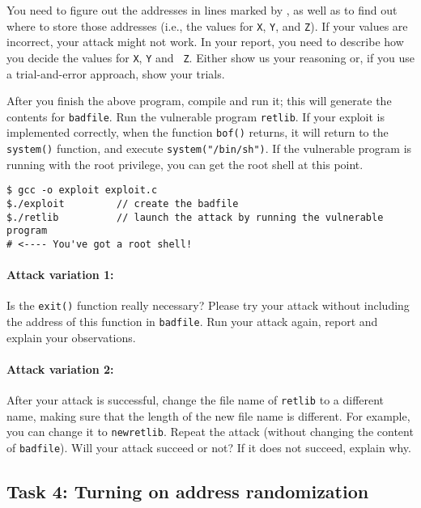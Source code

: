 You need to figure out the addresses in lines marked by , as well as to
find out where to store those addresses (i.e., the values 
for \texttt{X}, \texttt{Y}, and \texttt{Z}). If your values are incorrect, 
your attack might not work. In your report, you need to 
describe how you decide the values for {\tt X}, {\tt Y} and {\tt
Z}. Either show us your reasoning or, if you use a trial-and-error approach,
show your trials.


After you finish the above program, compile and run it; this will
generate the contents for \texttt{badfile}. Run the vulnerable program 
\texttt{retlib}. If your exploit is implemented correctly, when the function
\texttt{bof()} returns, it will return to the \texttt{system()} function,
and execute \texttt{system("/bin/sh")}. If the vulnerable program is
running with the root privilege, you can get the root shell at this
point.

\begin{lstlisting}
$ gcc -o exploit exploit.c
$./exploit         // create the badfile
$./retlib          // launch the attack by running the vulnerable program
# <---- You've got a root shell! 
\end{lstlisting}




\paragraph{Attack variation 1:}
Is the \texttt{exit()} function really necessary? Please try 
your attack without including the address of this function in
\texttt{badfile}. Run your attack again, report and explain your
observations.  



\paragraph{Attack variation 2:} 
After your attack is successful, change the file name of \texttt{retlib}
to a different name, making sure that the length of the new 
file name is different. For example, you can change it to \texttt{newretlib}. 
Repeat the attack (without changing the content of {\tt badfile}). 
Will your attack succeed or not?  If it does not succeed, explain why.



\subsection{Task 4: Turning on address randomization}

